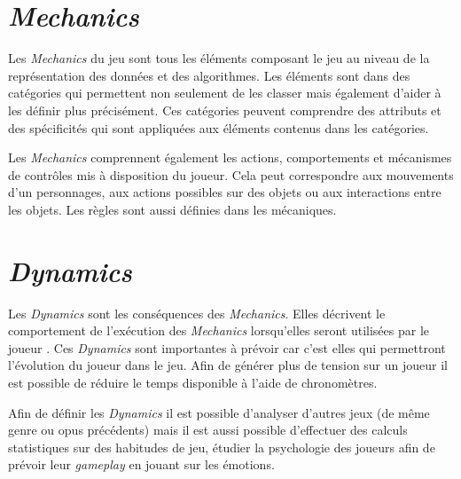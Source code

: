 \section{\emph{Mechanics}}
Les \emph{Mechanics} du jeu sont tous les éléments composant le jeu au niveau de la représentation des données et des algorithmes. Les éléments sont dans des catégories qui permettent non seulement de les classer mais également d'aider à les définir plus précisément. Ces catégories peuvent comprendre des attributs et des spécificités qui sont appliquées aux éléments contenus dans les catégories.

Les \emph{Mechanics} comprennent également les actions, comportements et mécanismes de contrôles mis à disposition du joueur. Cela peut correspondre aux mouvements d'un personnages, aux actions possibles sur des objets ou aux interactions entre les objets. Les règles sont aussi définies dans les mécaniques.


\section{\emph{Dynamics}}

Les \emph{Dynamics} sont les conséquences des \emph{Mechanics}. Elles décrivent le comportement de l'exécution des \emph{Mechanics} lorsqu'elles seront utilisées par le joueur \cite{GAMA_MDA}. Ces \emph{Dynamics} sont importantes à prévoir car c'est elles qui permettront l'évolution du joueur dans le jeu. Afin de générer plus de tension sur un joueur il est possible de réduire le temps disponible à l'aide de chronomètres. 

Afin de définir les \emph{Dynamics} il est possible d'analyser d'autres jeux (de même genre ou opus précédents) mais il est aussi possible d'effectuer des calculs statistiques sur des habitudes de jeu, étudier la psychologie des joueurs afin de prévoir leur \emph{gameplay} en jouant sur les émotions.


